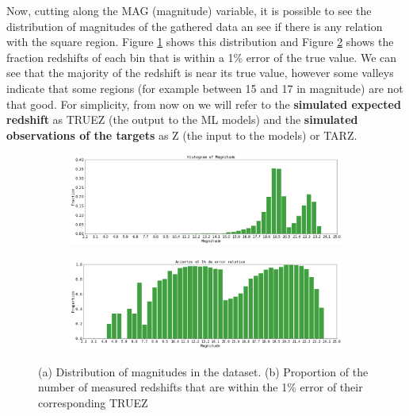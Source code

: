 Now, cutting along the MAG (magnitude) variable, it is possible to see the distribution of magnitudes of the gathered data an see if there is any relation with the square region. Figure \ref{fig:mag-dist} shows this distribution and Figure \ref{fig:mag-prop-dist} shows the fraction redshifts of each bin that is within a 1\% error of the true value. We can see that the majority of the redshift is near its true value, however some valleys indicate that some regions (for example between 15 and 17 in magnitude) are not that good. For simplicity, from now on we will refer to the \textbf{simulated expected redshift} as TRUEZ (the output to the ML models) and the \textbf{simulated observations of the targets} as Z (the input to the models) or TARZ.
\begin{figure}
	\centering
	\begin{subfigure}[b]{1.0\textwidth}
		\includegraphics[width=1\linewidth]{TeX_files/Imagenes/mag-dist}
		\caption{}
		\label{fig:mag-dist} 
	\end{subfigure}	
	\begin{subfigure}[b]{1.0\textwidth}
		\includegraphics[width=1\linewidth]{TeX_files/Imagenes/mag-prop-dist}
		\caption{}
		\label{fig:mag-prop-dist}
	\end{subfigure}
	\caption{(a) Distribution of magnitudes in the dataset. (b) Proportion of the number of measured redshifts that are within the 1\% error of their corresponding TRUEZ }
	\label{fig:mag-dist-both}
\end{figure}
